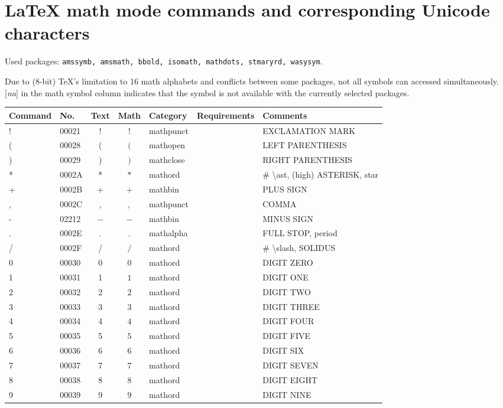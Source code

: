 \documentclass[a4paper,landscape]{article}
\begin{document}
\section*{LaTeX math mode commands and corresponding Unicode characters}

Used packages: \texttt{amssymb, amsmath, bbold, isomath, mathdots, stmaryrd, wasysym}.

Due to (8-bit) TeX's limitation to 16 math alphabets and conflicts
between some packages, not all symbols can accessed simultaneously.
[\emph{na}] in the math symbol column indicates that the symbol is not
available with the currently selected packages. 
\begin{longtable}{llcclll}
\toprule
Command & No. & Text & Math & Category & Requirements & Comments\\
\midrule
\endhead
! & 00021 & ! & $!$ & mathpunct &  & EXCLAMATION MARK \\
( & 00028 & ( & $($ & mathopen &  & LEFT PARENTHESIS \\
) & 00029 & ) & $)$ & mathclose &  & RIGHT PARENTHESIS \\
* & 0002A & * & $*$ & mathord &  & \# \textbackslash{}ast, (high) ASTERISK, star \\
+ & 0002B & + & $+$ & mathbin &  & PLUS SIGN \\
, & 0002C & , & $,$ & mathpunct &  & COMMA \\
- & 02212 & − & $-$ & mathbin &  & MINUS SIGN \\
. & 0002E & . & $.$ & mathalpha &  & FULL STOP, period \\
/ & 0002F & / & $/$ & mathord &  & \# \textbackslash{}slash, SOLIDUS \\
0 & 00030 & 0 & $0$ & mathord &  & DIGIT ZERO \\
1 & 00031 & 1 & $1$ & mathord &  & DIGIT ONE \\
2 & 00032 & 2 & $2$ & mathord &  & DIGIT TWO \\
3 & 00033 & 3 & $3$ & mathord &  & DIGIT THREE \\
4 & 00034 & 4 & $4$ & mathord &  & DIGIT FOUR \\
5 & 00035 & 5 & $5$ & mathord &  & DIGIT FIVE \\
6 & 00036 & 6 & $6$ & mathord &  & DIGIT SIX \\
7 & 00037 & 7 & $7$ & mathord &  & DIGIT SEVEN \\
8 & 00038 & 8 & $8$ & mathord &  & DIGIT EIGHT \\
9 & 00039 & 9 & $9$ & mathord &  & DIGIT NINE \\

\end{longtable}
\end{document}
